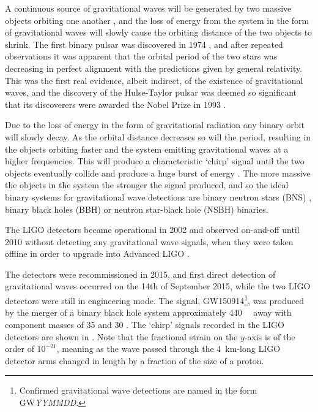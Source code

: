 \begin{colsection}
\begin{colsection}
A continuous source of gravitational waves will be generated by two massive objects orbiting one another \citep{GW_sources}, and the loss of energy from the system in the form of gravitational waves will slowly cause the orbiting distance of the two objects to shrink. The first binary pulsar was discovered in 1974 \citep{HulseTaylor}, and after repeated observations it was apparent that the orbital period of the two stars was decreasing in perfect alignment with the predictions given by general relativity. This was the first real evidence, albeit indirect, of the existence of gravitational waves, and the discovery of the Hulse-Taylor pulsar was deemed so significant that its discoverers were awarded the Nobel Prize in 1993 \citep{HulseTaylor2}.

Due to the loss of energy in the form of gravitational radiation any binary orbit will slowly decay. As the orbital distance decreases so will the period, resulting in the objects orbiting faster and the system emitting gravitational waves at a higher frequencies. This will produce a characteristic `chirp' signal until the two objects eventually collide and produce a huge burst of energy \citep{GW_sources, BIGparis}. The more massive the objects in the system the stronger the signal produced, and so the ideal binary systems for gravitational wave detections are binary neutron stars (BNS) , binary black holes (BBH)  or neutron star-black hole (NSBH)  binaries.

The LIGO detectors became operational in 2002 and observed on-and-off until 2010 without detecting any gravitational wave signals, when they were taken offline in order to upgrade into Advanced LIGO \citep{LIGO_initial, LIGO_advanced}.

The detectors were recommissioned in 2015, and first direct detection of gravitational waves occurred on the 14th of September 2015, while the two LIGO detectors were still in engineering mode. The signal, GW150914\footnote{Confirmed gravitational wave detections are named in the form GW\textit{YYMMDD}.}, was produced by the merger of a binary black hole system approximately \SI{440}{\mega\parsec} away with component masses of \SI{35}{\solarmass} and \SI{30}{\solarmass} \citep{GW150914}. The `chirp' signals recorded in the LIGO detectors are shown in . Note that the fractional strain on the $y$-axis is of the order of $10^{-21}$, meaning as the wave passed through the \SI{4}{\kilo\metre}-long LIGO detector arms changed in length by a fraction of the size of a proton.


\end{colsection}
\end{colsection}
